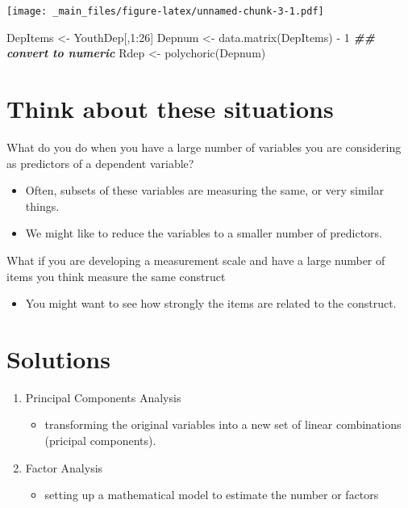 \documentclass[
]{book}
\newenvironment{Shaded}{\begin{snugshade}}{\end{snugshade}}
\newcommand{\DecValTok}[1]{\textcolor[rgb]{0.00,0.00,0.81}{#1}}
\newcommand{\DocumentationTok}[1]{\textcolor[rgb]{0.56,0.35,0.01}{\textbf{\textit{#1}}}}
\newcommand{\FunctionTok}[1]{\textcolor[rgb]{0.00,0.00,0.00}{#1}}
\newcommand{\NormalTok}[1]{#1}
\newcommand{\OtherTok}[1]{\textcolor[rgb]{0.56,0.35,0.01}{#1}}
\newcommand{\SpecialCharTok}[1]{\textcolor[rgb]{0.00,0.00,0.00}{#1}}
\providecommand{\tightlist}{%
  \setlength{\itemsep}{0pt}\setlength{\parskip}{0pt}}
\begin{document}
\texttt{[image: \_main\_files/figure-latex/unnamed-chunk-3-1.pdf]}

\begin{Shaded}
\begin{Highlighting}[]
\NormalTok{DepItems }\OtherTok{\textless{}{-}}\NormalTok{ YouthDep[,}\DecValTok{1}\SpecialCharTok{:}\DecValTok{26}\NormalTok{] }
\NormalTok{Depnum }\OtherTok{\textless{}{-}} \FunctionTok{data.matrix}\NormalTok{(DepItems) }\SpecialCharTok{{-}} \DecValTok{1}  \DocumentationTok{\#\# convert to numeric   }
\NormalTok{Rdep }\OtherTok{\textless{}{-}} \FunctionTok{polychoric}\NormalTok{(Depnum)}
\end{Highlighting}
\end{Shaded}

\hypertarget{think-about-these-situations}{%
\section{Think about these situations}\label{think-about-these-situations}}

What do you do when you have a large number of variables you are considering as predictors of a dependent variable?

\begin{itemize}
\tightlist
\item
  Often, subsets of these variables are measuring the same, or very similar things.
\item
  We might like to reduce the variables to a smaller number of predictors.
\end{itemize}

What if you are developing a measurement scale and have a large number of items you think measure the same construct

\begin{itemize}
\tightlist
\item
  You might want to see how strongly the items are related to the construct.
\end{itemize}

\hypertarget{solutions}{%
\section{Solutions}\label{solutions}}

\begin{enumerate}
\def\labelenumi{\arabic{enumi}.}
\item
  Principal Components Analysis

  \begin{itemize}
  \tightlist
  \item
    transforming the original variables into a new set of linear combinations (pricipal components).
  \end{itemize}
\item
  Factor Analysis

  \begin{itemize}
  \tightlist
  \item
    setting up a mathematical model to estimate the number or factors
  \end{itemize}
\end{enumerate}
\end{document}
